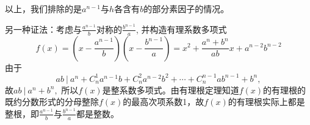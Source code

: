 以上，我们排除的是$a^{n-1}$与$h$各含有$b$的部分素因子的情况。

另一种证法：考虑与$\frac{a^{n-1}}{b}$对称的$\frac{b^{n-1}}{a}$, 并构造有理系数多项式
$$f(x) = \left(x-\frac{a^{n-1}}{b}\right) \left(x-\frac{b^{n-1}}{a}\right) = x^2 + \frac{a^n+b^n}{ab} x + a^{n-2}b^{n-2}$$
由于
$$ab\ |\ a^n + C_n^1a^{n-1}b + C_n^2a^{n-2}b^2 + \cdots + C_n^{n-1}ab^{n-1} + b^n,$$
故$ab\ |\ a^n + b^n,$ 所以$f(x)$是整系数多项式。由有理根定理知道$f(x)$的有理根的既约分数形式的分母整除$f(x)$的最高次项系数1，故$f(x)$的有理根实际上都是整根，即$\frac{a^{n-1}}{b}$与$\frac{b^{n-1}}{a}$都是整数。



